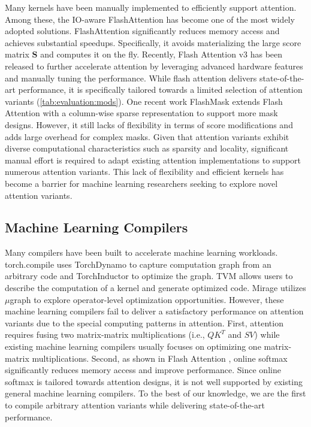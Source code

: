 Many kernels have been manually implemented to efficiently support attention. Among these, the IO-aware FlashAttention \cite{flashattention2} has become one of the most widely adopted solutions. FlashAttention significantly reduces memory access and achieves substantial speedups. 
Specifically, it avoids materializing the large score matrix $\mathbf{S}$ and computes it on the fly.
Recently, Flash Attention v3 has been released to further accelerate attention by leveraging advanced hardware features and manually tuning the performance.
While flash attention delivers state-of-the-art performance, it is specifically tailored towards a limited selection of attention variants (\autoref{tab:evaluation:mods}).
One recent work FlashMask \cite{wang2024flashmask} extends Flash Attention with a column-wise sparse representation to support more mask designs.
However, it still lacks of flexibility in terms of score modifications and adds large overhead for complex masks.
Given that attention variants exhibit diverse computational characteristics such as sparsity and locality, significant manual effort is required to adapt existing attention implementations to support numerous attention variants.
This lack of flexibility and efficient kernels has become a barrier for machine learning researchers seeking to explore novel attention variants.


\subsection{Machine Learning Compilers}
Many compilers have been built to accelerate machine learning workloads.
torch.compile \cite{pytorch2} uses TorchDynamo to capture computation graph from an arbitrary code and TorchInductor to optimize the graph.
TVM \cite{TVM} allows users to describe the computation of a kernel and generate optimized code.
Mirage \cite{mirage} utilizes $\mu$graph to explore operator-level optimization opportunities. 
However, these machine learning compilers fail to deliver a satisfactory performance on attention variants due to the special computing patterns in attention.
First, attention requires fusing two matrix-matrix multiplications (i.e., $QK^T$ and $SV$) while existing machine learning compilers usually focuses on optimizing one matrix-matrix multiplications.
Second, as shown in Flash Attention \cite{flashattention2}, online softmax significantly reduces memory access and improve performance. Since online softmax is tailored towards attention designs, it is not well supported by existing general machine learning compilers.
To the best of our knowledge, we are the first to compile arbitrary attention variants while delivering state-of-the-art performance.










